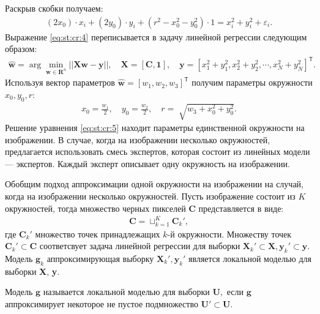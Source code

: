 Раскрыв скобки получаем:
\[
\label{eq:st:cr:4}
\begin{aligned}
\left(2x_0\right)\cdot x_i + \left(2y_0\right)\cdot y_i+\left(r^2-x_0^2-y_0^2\right)\cdot1 = x_{i}^2 + y_{i}^2 + \varepsilon_i.
\end{aligned}
\]
Выражение \eqref{eq:st:cr:4} переписывается в задачу линейной регрессии следующим образом:
\[
\label{eq:st:cr:5}
\begin{aligned}
\hat{\textbf{w}} = \arg\min_{\textbf{w}\in \mathbf{R}^{n}}||\textbf{X}\textbf{w} - \textbf{y}||,  \quad \textbf{X} = \left[\textbf{C}, \textbf{1}\right], \quad \textbf{y} = \left[x_1^2+y_1^2, x_2^2+y_2^2, \cdots, x_N^2+y_N^2\right]^{\mathsf{T}}.
\end{aligned}
\]
Используя вектор параметров $\hat{\textbf{w}} = \left[w_1, w_2, w_3\right]^{\mathsf{T}}$ получим параметры окружности $x_0, y_0, r$:
\[
\label{eq:st:cr:6}
\begin{aligned}
x_0 = \frac{w_1}{2}, \quad y_0 = \frac{w_2}{2}, \quad r = \sqrt[]{w_3+x_{0}^{2}+y_{0}^{2}}.
\end{aligned}
\]
Решение уравнения \eqref{eq:st:cr:5} находит параметры единственной окружности на изображении. В случае, когда на изображении несколько окружностей, предлагается использовать смесь экспертов, которая состоит из линейных модели --- экспертов. Каждый эксперт описывает одну окружность на изображении.

Обобщим подход аппроксимации одной окружности на изображении на случай, когда на изображении несколько окружностей. Пусть изображение состоит из $K$ окружностей, тогда множество черных пикселей $\textbf{C}$ представляется в виде:
\[
\label{eq:st:1}
\begin{aligned}
\textbf{C} = \sqcup_{k=1}^{K}\textbf{C}_{k}',
\end{aligned}
\]
где $\textbf{C}_{k}'$ множество точек принадлежащих $k$-й окружности. Множеству точек $\textbf{C}_{k}' \subset\textbf{C}$ соответсвует задача линейной регрессии для выборки $\textbf{X}_{k}' \subset \textbf{X}, \textbf{y}_{k}' \subset \textbf{y}$. Модель $\mathbf{g}_k$ аппроксимирующая выборку $\textbf{X}_{k}', \textbf{y}_{k}'$ является локальной моделью для выборки \textbf{X}, \textbf{y}.


\begin{definition}
\label{def:1}
Модель $\mathbf{g}$ называется локальной моделью для выборки $\textbf{U},$ если $\mathbf{g}$ аппроксимирует некоторое не пустое подмножество $\textbf{U}'\subset\textbf{U}$.
\end{definition}

